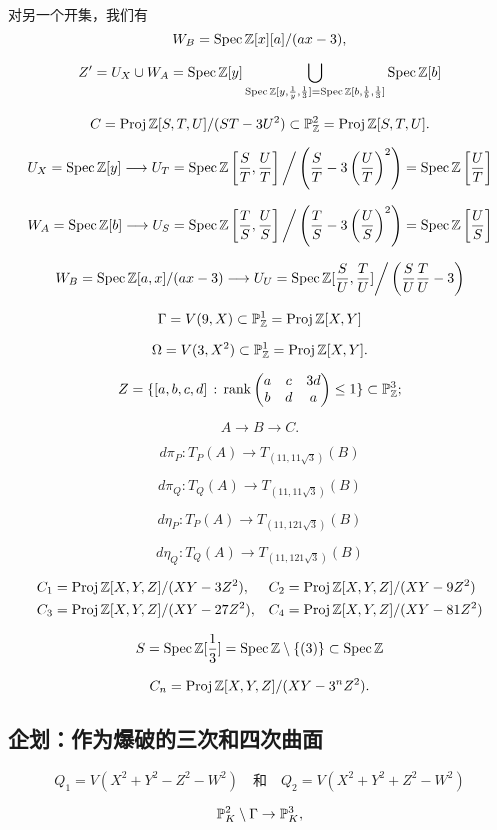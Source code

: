 对另一个开集，我们有
\[
	W_B=\operatorname{Spec} \mathbb{Z}[x][a]/(ax-3),
\]

\nottran

\[
	Z'=U_X\cup W_A=\operatorname{Spec} \mathbb{Z}[y]\bigcup_{\operatorname{Spec} \mathbb{Z}[y,\frac 1y,\frac 13]=\operatorname{Spec} \mathbb{Z}[b,\frac 1b,\frac 13]}\operatorname{Spec} \mathbb{Z}[b]
\]

\[
	C=\operatorname{Proj} \mathbb{Z}[S,T,U]/(ST-3U^2)\subset \mathbb P_{\mathbb{Z}}^2=\operatorname{Proj} \mathbb{Z}[S,T,U].
\]


\[
	U_X=\operatorname{Spec} \mathbb{Z}[y]\longrightarrow U_T=\operatorname{Spec} \mathbb{Z} \left[\frac ST,\frac UT\right]\bigg / \left(\frac ST-3\left(\frac UT\right)^2\right)=\operatorname{Spec} \mathbb{Z} \left[\frac UT\right]
\]

\[
	W_A=\operatorname{Spec} \mathbb{Z}[b]\longrightarrow U_S=\operatorname{Spec} \mathbb{Z} \left[\frac TS,\frac US\right]\bigg / \left(\frac TS-3\left(\frac US\right)^2\right)=\operatorname{Spec} \mathbb{Z} \left[\frac US\right]
\]

\[
	W_B=\operatorname{Spec} \mathbb{Z}[a,x]/(ax-3)\longrightarrow U_U=\operatorname{Spec} \mathbb{Z}[\frac SU,\frac TU]\bigg / \left(\frac SU \frac TU-3\right)
\]

\[
	\Gamma = V(9,X)\subset \mathbb P_{\mathbb{Z}}^1=\operatorname{Proj} \mathbb{Z}[X,Y]
\]

\[
	\Omega=V(3,X^2)\subset \mathbb P_{\mathbb{Z}}^1=\operatorname{Proj} \mathbb{Z}[X,Y].
\]

\[
	Z=\{[a,b,c,d]\,:\,\operatorname{rank}\begin{pmatrix}
		a&c&3d\\ b&d&a
	\end{pmatrix}\leq 1\}\subset \mathbb P_{\mathbb{Z}}^3;
\]

\[
	A\longrightarrow B\longrightarrow C.
\]

\[
	d\pi_P:T_P(A)\longrightarrow T_{(11,11\sqrt 3)}(B)
\]

\[
	d\pi_Q:T_Q(A)\longrightarrow T_{(11,11\sqrt 3)}(B)
\]

\[
	d\eta_P:T_P(A)\longrightarrow T_{(11,121\sqrt 3)}(B)
\]


\[
	d\eta_Q:T_Q(A)\longrightarrow T_{(11,121\sqrt 3)}(B)
\]

\[
	\begin{aligned}
		&C_1=\operatorname{Proj} \mathbb{Z}[X,Y,Z]/(XY-3Z^2),&&C_2=\operatorname{Proj} \mathbb{Z}[X,Y,Z]/(XY-9Z^2)\\
		&C_3=\operatorname{Proj} \mathbb{Z}[X,Y,Z]/(XY-27Z^2),&&C_4=\operatorname{Proj} \mathbb{Z}[X,Y,Z]/(XY-81Z^2)
	\end{aligned}
\]

\[
	S=\operatorname{Spec} \mathbb{Z}[\frac 13]=\operatorname{Spec} \mathbb{Z}\setminus\{(3)\}\subset \operatorname{Spec} \mathbb{Z}
\]


\[
	C_n=\operatorname{Proj} \mathbb{Z}[X,Y,Z]/(XY-3^nZ^2).
\]

\subsection{企划：作为爆破的三次和四次曲面}\label{s:4.2.5}

\[
	Q_1=V(X^2+Y^2-Z^2-W^2)\quad \text{和}\quad Q_2=V(X^2+Y^2+Z^2-W^2)
\]


\[
	\mathbb{P}_K^2\setminus \Gamma\to \mathbb{P}_K^3,
\]